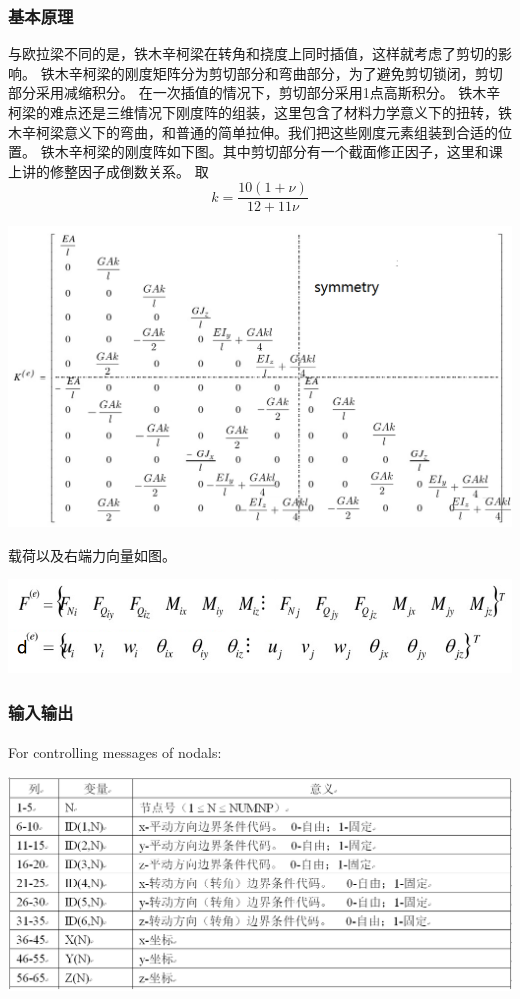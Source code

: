 \documentclass[UTF8]{ctexbook}
\begin{document}
\subsubsection{基本原理}
与欧拉梁不同的是，铁木辛柯梁在转角和挠度上同时插值，这样就考虑了剪切的影响。
铁木辛柯梁的刚度矩阵分为剪切部分和弯曲部分，为了避免剪切锁闭，剪切部分采用减缩积分。
在一次插值的情况下，剪切部分采用1点高斯积分。
铁木辛柯梁的难点还是三维情况下刚度阵的组装，这里包含了材料力学意义下的扭转，铁木辛柯梁意义下的弯曲，和普通的简单拉伸。我们把这些刚度元素组装到合适的位置。
铁木辛柯梁的刚度阵如下图。其中剪切部分有一个截面修正因子，这里和课上讲的修整因子成倒数关系。
取
$$k=\frac{10(1+\nu)}{12+11\nu}$$
\begin{center}
\includegraphics[width=1.0\textwidth]{timoshenko1.png}
\end{center}
载荷以及右端力向量如图。
\begin{center}
\includegraphics[width=1.0\textwidth]{beam2.png}
\end{center}
\subsubsection{输入输出}
\paragraph{}For controlling messages of nodals:
\begin{center}
\includegraphics[width=1.0\textwidth]{beam3.png}
\end{center}
\end{document}

